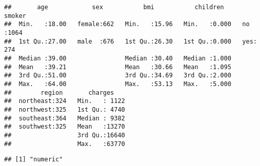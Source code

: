 \documentclass[
]{article}
\newenvironment{Shaded}{\begin{snugshade}}{\end{snugshade}}
\newcommand{\CommentTok}[1]{\textcolor[rgb]{0.56,0.35,0.01}{\textit{#1}}}
\newcommand{\FunctionTok}[1]{\textcolor[rgb]{0.13,0.29,0.53}{\textbf{#1}}}
\newcommand{\NormalTok}[1]{#1}
\newcommand{\OtherTok}[1]{\textcolor[rgb]{0.56,0.35,0.01}{#1}}
\newcommand{\SpecialCharTok}[1]{\textcolor[rgb]{0.81,0.36,0.00}{\textbf{#1}}}
\begin{document}
\begin{Shaded}
\end{Shaded}

\begin{verbatim}
##       age            sex           bmi           children     smoker    
##  Min.   :18.00   female:662   Min.   :15.96   Min.   :0.000   no :1064  
##  1st Qu.:27.00   male  :676   1st Qu.:26.30   1st Qu.:0.000   yes: 274  
##  Median :39.00                Median :30.40   Median :1.000             
##  Mean   :39.21                Mean   :30.66   Mean   :1.095             
##  3rd Qu.:51.00                3rd Qu.:34.69   3rd Qu.:2.000             
##  Max.   :64.00                Max.   :53.13   Max.   :5.000             
##        region       charges     
##  northeast:324   Min.   : 1122  
##  northwest:325   1st Qu.: 4740  
##  southeast:364   Median : 9382  
##  southwest:325   Mean   :13270  
##                  3rd Qu.:16640  
##                  Max.   :63770
\end{verbatim}

\begin{Shaded}
\end{Shaded}

\begin{verbatim}
## [1] "numeric"
\end{verbatim}
\end{document}
